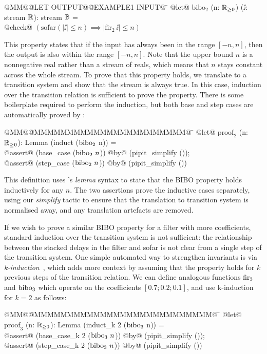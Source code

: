 \documentclass[sigplan,screen, review]{acmart}
\begin{document}
\begin{tabbing}
  @MM@\= @LET OUTPUT@\= @EXAMPLE1 INPUT@ \= \kill
  @let@ $\mbox{bibo}_2$ (n: $\mathbb{R}_{\ge0}$) ($\ii$: stream $\mathbb{R}$): stream $\mathbb{B}$ = \\
  \> @check@ $(\mbox{sofar}(|\ii| \le n) \implies |\mbox{fir}_2~\ii| \le n)$
\end{tabbing}

This property states that if the input has always been in the range $[-n, n]$, then the output is also within the range $[-n, n]$.
Note that the upper bound $n$ is a nonnegative real rather than a stream of reals, which means that $n$ stays constant across the whole stream.
To prove that this property holds, we translate to a transition system and show that the stream is always true.
In this case, induction over the transition relation is sufficient to prove the property.
There is some boilerplate required to perform the induction, but both base and step cases are automatically proved by \fstar{}:

\begin{tabbing}
  @MM@\= @MMMMMMMMMMMMMMMMMMMMMMM@ \= \kill
  @let@ $\mbox{proof}_2$ (n: $\mathbb{R}_{\ge0}$): Lemma (induct ($\mbox{bibo}_2$ n)) = \\
  \> @assert@ (base\_case ($\mbox{bibo}_2 ~n$)) \> @by@ (pipit\_simplify ()); \\
  \> @assert@ (step\_case ($\mbox{bibo}_2 ~n$)) \> @by@ (pipit\_simplify ())
\end{tabbing}

This definition uses \fstar{}'s \emph{lemma} syntax to state that the BIBO property holds inductively for any $n$.
The two assertions prove the inductive cases separately, using our \emph{simplify} tactic to ensure that the translation to transition system is normalised away, and any translation artefacts are removed.

If we wish to prove a similar BIBO property for a filter with more coefficients, standard induction over the transition system is not sufficient: the relationship between the stacked delays in the filter and sofar is not clear from a single step of the transition system.
One simple automated way to strengthen invariants is via \emph{k-induction}~\cite{hagen2008scaling}, which adds more context by assuming that the property holds for $k$ previous steps of the transition relation.
We can define analogous functions $\mbox{fir}_3$ and $\mbox{bibo}_3$ which operate on the coefficients $[0.7; 0.2; 0.1]$, and use k-induction for $k = 2$ as follows:

\begin{tabbing}
  @MM@\= @MMMMMMMMMMMMMMMMMMMMMMMMMMM@ \= \kill
  @let@ $\mbox{proof}_3$ (n: $\mathbb{R}_{\ge0}$): Lemma (induct\_k 2 ($\mbox{bibo}_3$ n)) = \\
  \> @assert@ (base\_case\_k 2 ($\mbox{bibo}_3 ~n$)) \> @by@ (pipit\_simplify ()); \\
  \> @assert@ (step\_case\_k 2 ($\mbox{bibo}_3 ~n$)) \> @by@ (pipit\_simplify ())
\end{tabbing}
\end{document}
